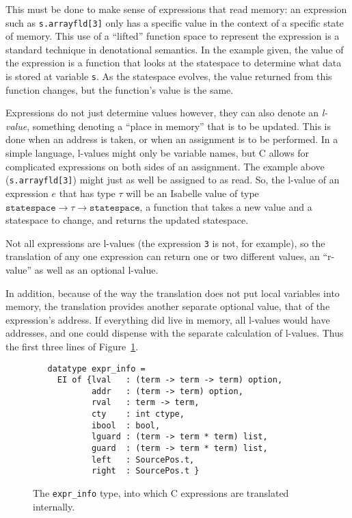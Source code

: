 \documentclass{article}
\begin{document}
This must be done to make sense of expressions that read memory: an
expression such as \texttt{s.arrayfld[3]} only has a specific value in
the context of a specific state of memory.  This use of a ``lifted''
function space to represent the expression is a standard technique in
denotational semantics.  In the example given, the value of the
expression is a function that looks at the statespace to determine
what data is stored at variable \texttt{s}.  As the statespace
evolves, the value returned from this function changes, but the
function's value is the same.

Expressions do not just determine values however, they can also denote
an \emph{l-value}, something denoting a ``place in memory'' that is to
be updated.  This is done when an address is taken, or when an
assignment is to be performed.  In a simple language, l-values might
only be variable names, but C allows for complicated expressions on
both sides of an assignment.  The example above
(\texttt{s.arrayfld[3]}) might just as well be assigned to as read.
So, the l-value of an expression $e$ that has type $\tau$ will be an
Isabelle value of type $\texttt{statespace} \rightarrow
\tau\rightarrow\texttt{statespace}$, a function that takes a new
value and a statespace to change, and returns the updated statespace.

Not all expressions are l-values (the expression \texttt{3} is not,
for example), so the translation of any one expression can return one
or two different values, an ``r-value'' as well as an optional
l-value.

In addition, because of the way the translation does not put local
variables into memory, the translation provides another separate
optional value, that of the expression's address.  If everything did
live in memory, all l-values would have addresses, and one could
dispense with the separate calculation of l-values.  Thus the first
three lines of Figure~\ref{fig:exprinfo}.

\begin{figure}
\begin{verbatim}
   datatype expr_info =
     EI of {lval   : (term -> term -> term) option,
            addr   : (term -> term) option,
            rval   : term -> term,
            cty    : int ctype,
            ibool  : bool,
            lguard : (term -> term * term) list,
            guard  : (term -> term * term) list,
            left   : SourcePos.t,
            right  : SourcePos.t }
\end{verbatim}
\caption{The \texttt{expr_info} type, into which C expressions are
  translated internally.}
\label{fig:exprinfo}
\end{figure}
\end{document}
